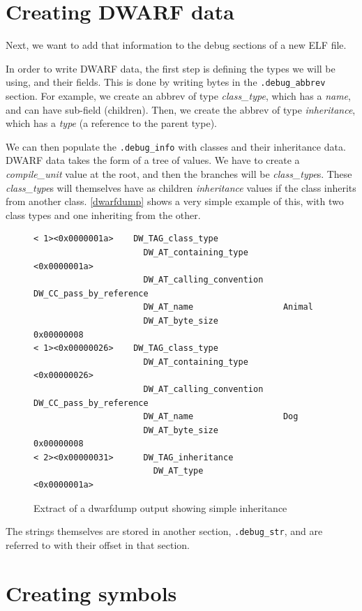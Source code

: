 \documentclass[a4paper,11pt,oneside]{report}
\begin{document}
\section{Creating DWARF data}
\label{dwarfimplementation}

Next, we want to add that information to the debug sections of a new ELF file.

In order to write DWARF data, the first step is defining the types we will be 
using, and their fields.
This is done by writing bytes in the \texttt{.debug\_abbrev} section.
For example, we create an abbrev of type \emph{class\_type}, which has a 
\emph{name}, and can have sub-field (children).
Then, we create the abbrev of type \emph{inheritance}, which has a 
\emph{type} (a reference to the parent type).

We can then populate the \texttt{.debug\_info} with classes and their 
inheritance data.
DWARF data takes the form of a tree of values. We have to create a 
\emph{compile\_unit} value at the root, and then the branches will be 
\emph{class\_type}s.
These \emph{class\_type}s will themselves have as children 
\emph{inheritance} values if the class inherits from another class.
\autoref{dwarfdump} shows a very simple example of this, with two class types 
and one inheriting from the other.

\begin{figure}
\begin{lstlisting}
< 1><0x0000001a>    DW_TAG_class_type
                      DW_AT_containing_type       <0x0000001a>
                      DW_AT_calling_convention    DW_CC_pass_by_reference
                      DW_AT_name                  Animal
                      DW_AT_byte_size             0x00000008
< 1><0x00000026>    DW_TAG_class_type
                      DW_AT_containing_type       <0x00000026>
                      DW_AT_calling_convention    DW_CC_pass_by_reference
                      DW_AT_name                  Dog
                      DW_AT_byte_size             0x00000008
< 2><0x00000031>      DW_TAG_inheritance
                        DW_AT_type                  <0x0000001a>
\end{lstlisting}
\caption{Extract of a dwarfdump output showing simple inheritance}
\label{dwarfdump}
\end{figure}

The strings themselves are stored in another section, \texttt{.debug\_str}, and 
are referred to with their offset in that section.


\section{Creating symbols}
\end{document}
